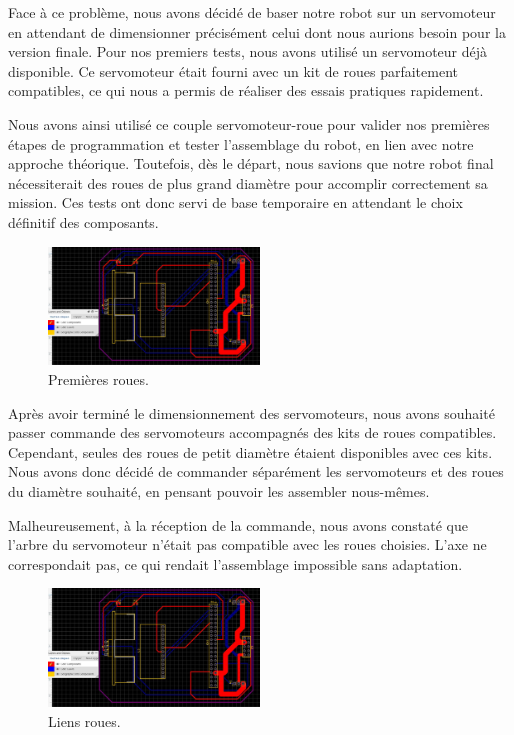 \documentclass[a4paper,12pt]{report}  %
\begin{document}
Face à ce problème, nous avons décidé de baser notre robot sur un servomoteur en attendant de dimensionner précisément celui dont nous aurions besoin pour la version finale. Pour nos premiers tests, nous avons utilisé un servomoteur déjà disponible. Ce servomoteur était fourni avec un kit de roues parfaitement compatibles, ce qui nous a permis de réaliser des essais pratiques rapidement.

Nous avons ainsi utilisé ce couple servomoteur-roue pour valider nos premières étapes de programmation et tester l’assemblage du robot, en lien avec notre approche théorique. Toutefois, dès le départ, nous savions que notre robot final nécessiterait des roues de plus grand diamètre pour accomplir correctement sa mission. Ces tests ont donc servi de base temporaire en attendant le choix définitif des composants.

\begin{figure}[H]
	\centering
	\includegraphics[width=0.5\textwidth]{./attachments/schema_pcb.jpg}
	\caption{Premières roues.}
\end{figure}

Après avoir terminé le dimensionnement des servomoteurs, nous avons souhaité passer commande des servomoteurs accompagnés des kits de roues compatibles. Cependant, seules des roues de petit diamètre étaient disponibles avec ces kits. Nous avons donc décidé de commander séparément les servomoteurs et des roues du diamètre souhaité, en pensant pouvoir les assembler nous-mêmes.

Malheureusement, à la réception de la commande, nous avons constaté que l’arbre du servomoteur n’était pas compatible avec les roues choisies. L’axe ne correspondait pas, ce qui rendait l’assemblage impossible sans adaptation.

\begin{figure}[H]
	\centering
	\includegraphics[width=0.5\textwidth]{./attachments/schema_pcb.jpg}
	\caption{Liens roues.}
\end{figure}
\end{document}
